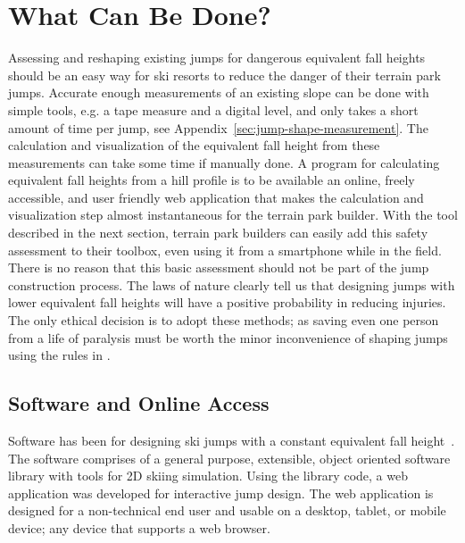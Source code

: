 \documentclass{article}
\begin{document}
\section{What Can Be Done?}
%
Assessing and reshaping existing jumps for dangerous equivalent fall heights
should be an easy way for ski resorts to reduce the danger of their terrain
park jumps. Accurate enough measurements of an existing slope can be done with
simple tools, e.g. a tape measure and a digital level, and only takes a short
amount of time per jump, see Appendix~\ref{sec:jump-shape-measurement}.  The
calculation and visualization of the equivalent fall height from these
measurements can take some time if manually done. A program for calculating
equivalent  fall heights from a hill profile is to be available an online,
freely accessible, and user friendly web application that makes the calculation
and visualization step almost instantaneous for the terrain park builder. With
the tool described in the next section, terrain park builders can easily add
this safety assessment to their toolbox, even using it from a smartphone while
in the field. There is no reason that this basic assessment should not be part
of the jump construction process. The laws of nature clearly tell us that
designing jumps with lower equivalent fall heights will have a positive
probability in reducing injuries.  The only ethical decision is to adopt these
methods; as saving even one person from a life of paralysis must be worth the
minor inconvenience of shaping jumps using the rules in \cite{Levy2015}.

\subsection{Software and Online Access}
%
Software has been for designing ski jumps with a constant equivalent fall
height~\cite{Moore2018}. The software comprises of a general purpose,
extensible, object oriented software library with tools for 2D skiing
simulation. Using the library code, a web application was developed for
interactive jump design. The web application is designed for a non-technical
end user and usable on a desktop, tablet, or mobile device; any device that
supports a web browser.
\end{document}
